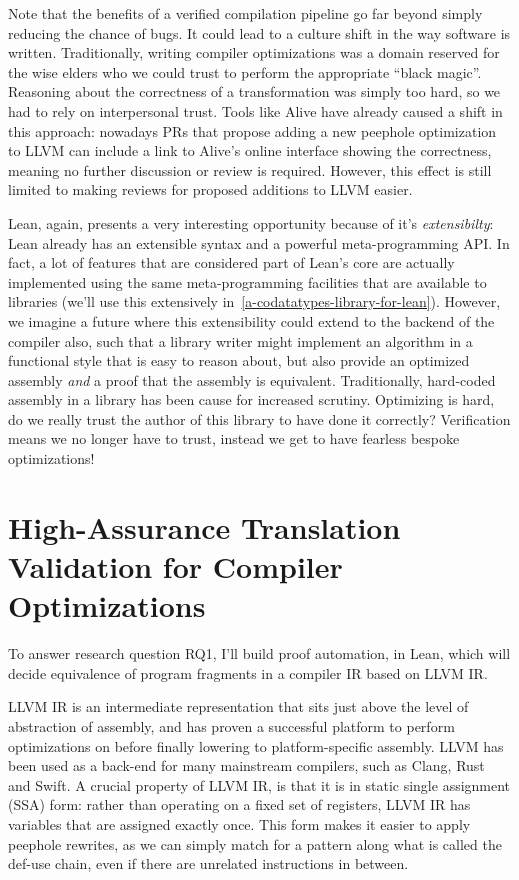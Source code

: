 \documentclass[a4paper]{scrartcl}
\begin{document}
Note that the benefits of a verified compilation pipeline go far beyond
simply reducing the chance of bugs. It could lead to a culture
shift in the way software is written. Traditionally, writing compiler
optimizations was a domain reserved for the wise elders who we could
trust to perform the appropriate ``black magic''. Reasoning about the
correctness of a transformation was simply too hard, so we had to rely
on interpersonal trust. Tools like Alive have already caused a shift in
this approach: nowadays PRs that propose adding a new peephole
optimization to LLVM can include a link to Alive's online interface
showing the correctness, meaning no further discussion or review is
required. However, this effect is still limited to making reviews for
proposed additions to LLVM easier.

Lean, again, presents a very interesting opportunity because of it's
\emph{extensibilty}: Lean already has an extensible syntax and a
powerful meta-programming API. In fact, a lot of features that are
considered part of Lean's core are actually implemented using the same
meta-programming facilities that are available to libraries (we'll use
this extensively in~\autoref{a-codatatypes-library-for-lean}). However, we imagine a future where this
extensibility could extend to the backend of the compiler also, such
that a library writer might implement an algorithm in a functional style
that is easy to reason about, but also provide an optimized assembly
\emph{and} a proof that the assembly is equivalent. Traditionally,
hard-coded assembly in a library has been cause for increased scrutiny.
Optimizing is hard, do we really trust the author of this library to
have done it correctly? Verification means we no longer have to trust,
instead we get to have fearless bespoke optimizations!

\section{High-Assurance Translation Validation for Compiler
Optimizations}\label{high-assurance-translation-validation-for-compiler-optimizations}

To answer research question \textsc{RQ1}, I'll build proof automation, in Lean,
which will decide equivalence of program fragments in a compiler IR based on LLVM IR.

LLVM IR is an intermediate representation that sits just above the level
of abstraction of assembly, and has proven a successful platform to
perform optimizations on before finally lowering to platform-specific
assembly. LLVM has been used as a back-end for many mainstream
compilers, such as Clang, Rust and Swift. A crucial property of LLVM IR, is that it is in static single assignment
(SSA) form: rather than operating on a fixed set of registers, LLVM IR
has variables that are assigned exactly once. This form makes it easier
to apply peephole rewrites, as we can simply match for a pattern along
what is called the def-use chain, even if there are unrelated
instructions in between.
\end{document}
